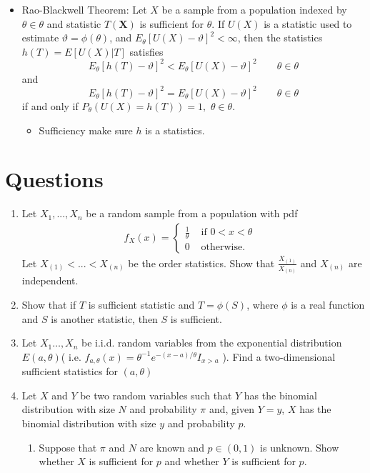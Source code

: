 \documentclass[12pt]{extarticle}
\newcommand{\X}{\mathbf X}
\begin{document}
\begin{itemize}
	
	\item Rao-Blackwell Theorem: 
	Let $X$ be a sample from a population indexed by $\theta\in \mathbb{\theta}$ and
	statistic $T(\X)$ is sufficient for $\theta$. If $U(X)$ is a statistic used to estimate $\vartheta=\phi(\theta)$, and $E_\theta[U(X)-\vartheta]^2<\infty$, then the statistics $h(T)=E[U(X)|T]$ satisfies 
	$$E_\theta[h(T)-\vartheta]^2<E_\theta[U(X)-\vartheta]^2\qquad\theta\in \mathbb{\theta}$$
and $$E_\theta[h(T)-\vartheta]^2=E_\theta[U(X)-\vartheta]^2\qquad\theta\in \mathbb{\theta}$$
	if and only if $P_\theta(U(X)=h(T))=1,$ $\theta\in \mathbb{\theta}$.
	\begin{itemize}
		\item Sufficiency make sure $h$ is a statistics.
	\end{itemize}
\end{itemize}


\section{Questions}

\begin{enumerate}
	\item Let $X_1, ..., X_n$ be a random sample from a population with pdf 
	\begin{align*}
	f_X(x)=\begin{cases}
	\frac{1}{\theta}& \text{ if $0<x<\theta$ } \\ 
	0& \text{ otherwise.} 
	\end{cases} 
	\end{align*}
	Let $X_{(1)}< ...< X_{(n)}$ be the order statistics. Show that $\frac{X_{(1)}}{X_{(n)}}$ and $X_{(n)}$ are independent.
	\vspace{4cm}

	\item Show that if $T$ is sufficient statistic and $T=\phi(S)$, where $\phi$ is a  real function and $S$ is another statistic, then $S$ is sufficient.	\vspace{3cm}
	\item Let $X_1 \dots, X_n$ be i.i.d. random variables from the exponential distribution $E(a,\theta)$( i.e. $f_{a, \theta}(x)=\theta^{-1}e^{-(x-a)/\theta} I_{x>a}$ ). Find a two-dimensional sufficient statistics for $(a,\theta)$
	\vspace{3cm}
	\item Let $X$ and $Y$ be two random variables such that $Y$ has the binomial distribution with size $N$ and probability $\pi$ and, given $Y = y$, $X$ has the binomial distribution with size $y$ and probability $p$.
	\begin{enumerate}
		\item Suppose that $\pi$ and $N$ are known and $p \in (0, 1)$ is unknown. Show whether $X$ is sufficient for $p$ and whether $Y$ is sufficient for $p$.
	\end{enumerate}
	

\end{enumerate}
 
\end{document}
